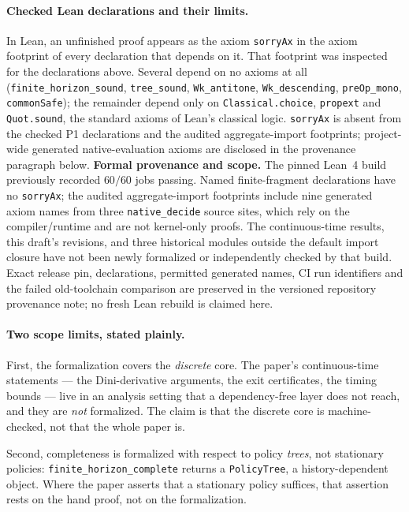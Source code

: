 \documentclass[10pt,twocolumn]{article}
\theoremstyle{definition}
\begin{document}
\paragraph{Checked Lean declarations and their limits.} In Lean, an unfinished proof appears as the axiom
\texttt{sorryAx} in the axiom footprint of every declaration that depends on it. That
footprint was inspected for the declarations above. Several depend on no axioms at all
(\texttt{finite\_horizon\_sound}, \texttt{tree\_sound}, \texttt{Wk\_antitone},
\texttt{Wk\_descending}, \texttt{preOp\_mono}, \texttt{commonSafe}); the remainder depend
only on \texttt{Classical.choice}, \texttt{propext} and \texttt{Quot.sound}, the standard
axioms of Lean's classical logic. \texttt{sorryAx} is absent from the checked P1 declarations and the audited aggregate-import footprints; project-wide generated native-evaluation axioms are disclosed in the provenance paragraph below.
\noindent\textbf{Formal provenance and scope.} The pinned Lean~4 build previously recorded \(60/60\) jobs passing. Named finite-fragment declarations have no \texttt{sorryAx}; the audited aggregate-import footprints include nine generated axiom names from three \texttt{native\_decide} source sites, which rely on the compiler/runtime and are not kernel-only proofs. The continuous-time results, this draft's revisions, and three historical modules outside the default import closure have not been newly formalized or independently checked by that build. Exact release pin, declarations, permitted generated names, CI run identifiers and the failed old-toolchain comparison are preserved in the versioned repository provenance note; no fresh Lean rebuild is claimed here.

\paragraph{Two scope limits, stated plainly.}

First, the formalization covers the \emph{discrete} core. The paper's continuous-time
statements --- the Dini-derivative arguments, the exit certificates, the timing bounds
--- live in an analysis setting that a dependency-free layer does not reach, and they are
\emph{not} formalized. The claim is that the discrete core is machine-checked, not that
the whole paper is.

Second, completeness is formalized with respect to policy \emph{trees}, not stationary
policies: \texttt{finite\_horizon\_complete} returns a \texttt{PolicyTree}, a
history-dependent object. Where the paper asserts that a stationary policy suffices,
that assertion rests on the hand proof, not on the formalization.
\end{document}
